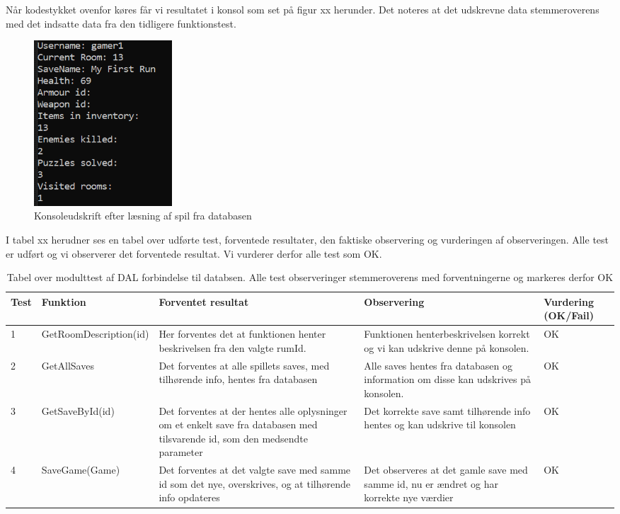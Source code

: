 Når kodestykket ovenfor køres får vi resultatet i konsol som set på figur xx herunder.
Det noteres at det udskrevne data stemmeroverens med det indsatte data fra den tidligere funktionstest.

\begin{figure}[H]
\centering
\includegraphics[width = 0.25\textwidth]{02-Body/Images/DAL-Database/ConsoleOutput.png}
\caption{Konsoleudskrift efter læsning af spil fra databasen}
\label{fig:Modulttest-consoleOutput}
\end{figure}


I tabel xx herudner ses en tabel over udførte test, forventede resultater, den faktiske observering og vurderingen af observeringen.
Alle test er udført og vi observerer det forventede resultat. Vi vurderer derfor alle test som OK.

\begin{table}[H]
\caption{Tabel over modulttest af DAL forbindelse til databsen. Alle test observeringer stemmeroverens med forventningerne og markeres derfor OK }
\begin{tabular}{|p{0.75cm}|p{3.6cm}|p{3.5cm}|p{3.5cm}|p{1.9cm}|} \hline
 \textbf{Test} & \textbf{Funktion} & \textbf{Forventet resultat} & \textbf{Observering} & \textbf{Vurdering} \textbf{(OK/Fail)}\\\hline
 1 & GetRoomDescription(id) & Her forventes det at funktionen henter beskrivelsen fra den valgte rumId. & Funktionen henterbeskrivelsen korrekt og vi kan udskrive denne på konsolen. & OK \\ \hline
 2 & GetAllSaves & Det forventes at alle spillets saves, med tilhørende info, hentes fra databasen & Alle saves hentes fra databasen og information om disse kan udskrives på konsolen. & OK \\ \hline
 3 & GetSaveById(id) & Det forventes at der hentes alle oplysninger om et enkelt save fra databasen med tilsvarende id, som den medsendte parameter & Det korrekte save samt tilhørende info hentes og kan udskrive til konsolen & OK \\ \hline
 4 & SaveGame(Game) & Det forventes at det valgte save med samme id som det nye, overskrives, og at tilhørende info opdateres & Det observeres at det gamle save med samme id, nu er ændret og har korrekte nye værdier & OK \\ \hline
\end{tabular}
\end{table}

